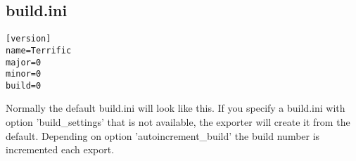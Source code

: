 \subsection{build.ini}

\begin{verbatim}
[version]
name=Terrific
major=0
minor=0
build=0
\end{verbatim}
\noindent Normally the default build.ini will look like this. If you specify a build.ini with option 'build\_settings' that is not available, the exporter will create it from the default. Depending on option 'autoincrement\_build' the build number is incremented each export.

